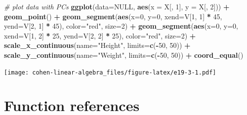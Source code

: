 \documentclass[
]{book}
\newenvironment{Shaded}{\begin{snugshade}}{\end{snugshade}}
\newcommand{\CommentTok}[1]{\textcolor[rgb]{0.56,0.35,0.01}{\textit{#1}}}
\newcommand{\DataTypeTok}[1]{\textcolor[rgb]{0.13,0.29,0.53}{#1}}
\newcommand{\DecValTok}[1]{\textcolor[rgb]{0.00,0.00,0.81}{#1}}
\newcommand{\KeywordTok}[1]{\textcolor[rgb]{0.13,0.29,0.53}{\textbf{#1}}}
\newcommand{\NormalTok}[1]{#1}
\newcommand{\OperatorTok}[1]{\textcolor[rgb]{0.81,0.36,0.00}{\textbf{#1}}}
\newcommand{\OtherTok}[1]{\textcolor[rgb]{0.56,0.35,0.01}{#1}}
\newcommand{\StringTok}[1]{\textcolor[rgb]{0.31,0.60,0.02}{#1}}
\begin{document}
\begin{Shaded}
\begin{Highlighting}[]
\CommentTok{\# plot data with PCs}
\KeywordTok{ggplot}\NormalTok{(}\DataTypeTok{data=}\OtherTok{NULL}\NormalTok{, }\KeywordTok{aes}\NormalTok{(}\DataTypeTok{x =}\NormalTok{ X[, }\DecValTok{1}\NormalTok{], }\DataTypeTok{y =}\NormalTok{ X[, }\DecValTok{2}\NormalTok{])) }\OperatorTok{+}\StringTok{ }
\StringTok{  }\KeywordTok{geom\_point}\NormalTok{() }\OperatorTok{+}\StringTok{ }
\StringTok{  }\KeywordTok{geom\_segment}\NormalTok{(}\KeywordTok{aes}\NormalTok{(}\DataTypeTok{x=}\DecValTok{0}\NormalTok{, }\DataTypeTok{y=}\DecValTok{0}\NormalTok{, }\DataTypeTok{xend=}\NormalTok{V[}\DecValTok{1}\NormalTok{, }\DecValTok{1}\NormalTok{] }\OperatorTok{*}\StringTok{ }\DecValTok{45}\NormalTok{, }\DataTypeTok{yend=}\NormalTok{V[}\DecValTok{2}\NormalTok{, }\DecValTok{1}\NormalTok{] }\OperatorTok{*}\StringTok{ }\DecValTok{45}\NormalTok{), }\DataTypeTok{color=}\StringTok{"red"}\NormalTok{, }\DataTypeTok{size=}\DecValTok{2}\NormalTok{) }\OperatorTok{+}
\StringTok{  }\KeywordTok{geom\_segment}\NormalTok{(}\KeywordTok{aes}\NormalTok{(}\DataTypeTok{x=}\DecValTok{0}\NormalTok{, }\DataTypeTok{y=}\DecValTok{0}\NormalTok{, }\DataTypeTok{xend=}\NormalTok{V[}\DecValTok{1}\NormalTok{, }\DecValTok{2}\NormalTok{] }\OperatorTok{*}\StringTok{ }\DecValTok{25}\NormalTok{, }\DataTypeTok{yend=}\NormalTok{V[}\DecValTok{2}\NormalTok{, }\DecValTok{2}\NormalTok{] }\OperatorTok{*}\StringTok{ }\DecValTok{25}\NormalTok{), }\DataTypeTok{color=}\StringTok{"red"}\NormalTok{, }\DataTypeTok{size=}\DecValTok{2}\NormalTok{) }\OperatorTok{+}
\StringTok{  }\KeywordTok{scale\_x\_continuous}\NormalTok{(}\DataTypeTok{name=}\StringTok{"Height"}\NormalTok{, }\DataTypeTok{limits=}\KeywordTok{c}\NormalTok{(}\OperatorTok{{-}}\DecValTok{50}\NormalTok{, }\DecValTok{50}\NormalTok{)) }\OperatorTok{+}\StringTok{ }
\StringTok{  }\KeywordTok{scale\_y\_continuous}\NormalTok{(}\DataTypeTok{name=}\StringTok{"Weight"}\NormalTok{, }\DataTypeTok{limits=}\KeywordTok{c}\NormalTok{(}\OperatorTok{{-}}\DecValTok{50}\NormalTok{, }\DecValTok{50}\NormalTok{)) }\OperatorTok{+}\StringTok{ }
\StringTok{  }\KeywordTok{coord\_equal}\NormalTok{()}
\end{Highlighting}
\end{Shaded}

\texttt{[image: cohen-linear-algebra\_files/figure-latex/e19-3-1.pdf]}

\hypertarget{function-references}{%
\chapter*{Function references}\label{function-references}}
\end{document}
